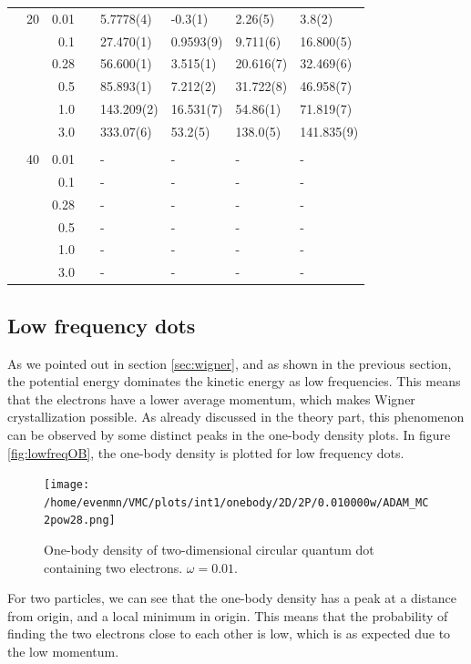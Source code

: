 \begin{table}
\begin{tabularx}{\textwidth}{R{1.5cm}rrcR{2.3cm}R{2.3cm}R{2.3cm}R{2.3cm}}
		&20 & 0.01 && 5.7778(4) & -0.3(1) & 2.26(5) & 3.8(2) \\
		&& 0.1 && 27.470(1) & 0.9593(9) & 9.711(6) & 16.800(5) \\
		&& 0.28 && 56.600(1) & 3.515(1) & 20.616(7) & 32.469(6) \\
		&& 0.5 && 85.893(1) & 7.212(2) & 31.722(8) & 46.958(7) \\
		&& 1.0 && 143.209(2) & 16.531(7) & 54.86(1) & 71.819(7) \\
		&& 3.0 && 333.07(6) & 53.2(5) & 138.0(5) & 141.835(9) \\ \hdashline \\
		
		&40 & 0.01 && - & - & - & - \\
		&& 0.1 && - & - & - & - \\
		&& 0.28 && - & - & - & - \\
		&& 0.5 && - & - & - & - \\
		&& 1.0 && - & - & - & - \\
		&& 3.0 && - & - & - & - \\ \hline \hline
	\end{tabularx}
\end{table}


\newpage
\subsection{Low frequency dots}
As we pointed out in section \ref{sec:wigner}, and as shown in the previous section, the potential energy dominates the kinetic energy as low frequencies. This means that the electrons have a lower average momentum, which makes Wigner crystallization possible. As already discussed in the theory part, this phenomenon can be observed by some distinct peaks in the one-body density plots. In figure \eqref{fig:lowfreqOB}, the one-body density is plotted for low frequency dots. 

\begin{figure}
	\centering
	\texttt{[image: /home/evenmn/VMC/plots/int1/onebody/2D/2P/0.010000w/ADAM\_MC2pow28.png]}
	\caption{One-body density of two-dimensional circular quantum dot containing two electrons. $\omega=0.01$.}
	\label{fig:lowfreqOB}
\end{figure}

For two particles, we can see that the one-body density has a peak at a distance from origin, and a local minimum in origin. This means that the probability of finding the two electrons close to each other is low, which is as expected due to the low momentum. 

